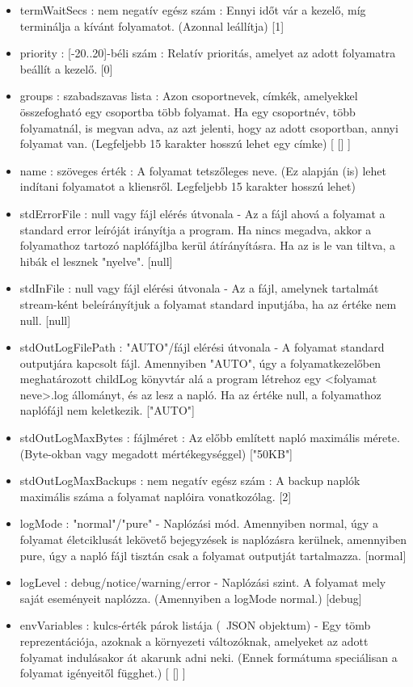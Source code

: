 \documentclass[12pt]{report}
\begin{document}
\begin{itemize}
  \item termWaitSecs : nem negatív egész szám : Ennyi időt vár a kezelő, míg terminálja a kívánt folyamatot. (Azonnal leállítja) [1]
  \item priority : [-20..20]-béli szám : Relatív prioritás, amelyet az adott folyamatra beállít a kezelő. [0]
  \item groups : szabadszavas lista : Azon csoportnevek, címkék, amelyekkel összefogható egy csoportba több folyamat. Ha egy csoportnév, több folyamatnál, is megvan adva, az azt jelenti, hogy az adott csoportban, annyi folyamat van. (Legfeljebb 15 karakter hosszú lehet egy címke) [ [] ]
  \item name : szöveges érték : A folyamat tetszőleges neve. (Ez alapján (is) lehet indítani folyamatot a kliensről. Legfeljebb 15 karakter hosszú lehet)
  \item stdErrorFile : null vagy fájl elérés útvonala - Az a fájl ahová a folyamat a standard error leíróját irányítja a program. Ha nincs megadva, akkor a folyamathoz tartozó naplófájlba kerül átírányításra. Ha az is le van tiltva, a hibák el lesznek "nyelve". [null]
  \item stdInFile : null vagy fájl elérési útvonala - Az a fájl, amelynek tartalmát stream-ként beleírányítjuk a folyamat standard inputjába, ha az értéke nem null. [null]
  \item stdOutLogFilePath : "AUTO"/fájl elérési útvonala - A folyamat standard outputjára kapcsolt fájl. Amennyiben "AUTO", úgy a folyamatkezelőben meghatározott childLog könyvtár alá a program létrehoz egy <folyamat neve>.log állományt, és az lesz a napló. Ha az értéke null, a folyamathoz naplófájl nem keletkezik. ["AUTO"]
  \item stdOutLogMaxBytes : fájlméret : Az előbb említett napló maximális mérete. (Byte-okban vagy megadott mértékegységgel) ["50KB"]
  \item stdOutLogMaxBackups : nem negatív egész szám : A backup naplók maximális száma a folyamat naplóira vonatkozólag. [2]
  \item logMode : "normal"/"pure" - Naplózási mód. Amennyiben normal, úgy a folyamat életciklusát lekövető bejegyzések is naplózásra kerülnek, amennyiben pure, úgy a napló fájl tisztán csak a folyamat outputját tartalmazza. [normal]
  \item logLevel : debug/notice/warning/error - Naplózási szint. A folyamat mely saját eseményeit naplózza. (Amennyiben a logMode normal.) [debug]
  \item envVariables : kulcs-érték párok listája (~JSON objektum) - Egy tömb reprezentációja, azoknak a környezeti változóknak, amelyeket az adott folyamat indulásakor át akarunk adni neki. (Ennek formátuma speciálisan a folyamat igényeitől függhet.) [ [] ]
  \end{itemize} 
\end{document}

